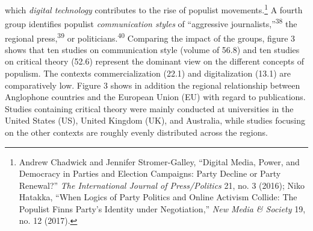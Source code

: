 \documentclass{tufte-handout}
\begin{document}
which \emph{digital technology} contributes to the rise of populist
movements.\footnote{Andrew Chadwick and Jennifer Stromer-Galley,
  ``Digital Media, Power, and Democracy in Parties and Election
  Campaigns: Party Decline or Party Renewal?'' \emph{The International
  Journal of Press/Politics} 21, no. 3 (2016); Niko Hatakka, ``When
  Logics of Party Politics and Online Activism Collide: The Populist
  Finns Party's Identity under Negotiation,'' \emph{New Media \&
  Society} 19, no. 12 (2017).} A fourth group identifies populist
\emph{communication styles} of ``aggressive journalists,''\textsuperscript{38} the regional
press,\textsuperscript{39} or
politicians.\textsuperscript{40} Comparing the impact of the groups,
figure 3 shows that ten studies on communication style (volume of 56.8)
and ten studies on critical theory (52.6) represent the dominant view on
the different concepts of populism. The contexts commercialization
(22.1) and digitalization (13.1) are comparatively low. Figure 3 shows
in addition the regional relationship between Anglophone countries and
the European Union (EU) with regard to publications. Studies containing
critical theory were mainly conducted at universities in the United
States (US), United Kingdom (UK), and Australia, while studies focusing
on the other contexts are roughly evenly distributed across the regions.
\end{document}
